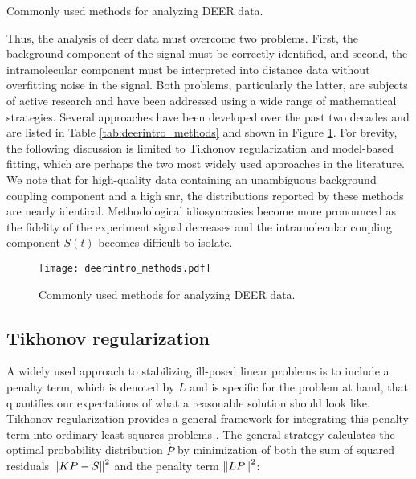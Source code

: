 \begin{wraptable}{r}{0.4\textwidth}
\scriptsize
\renewcommand{\tabcolsep}{0.09cm}
\centering
\caption[Commonly used methods for analyzing DEER data.]{Commonly used methods for analyzing DEER data.}

\label{tab:deerintro_methods}
\end{wraptable}

Thus, the analysis of \gls{deer} data must overcome two problems. First, the background component of the signal must be correctly identified, and second, the intramolecular component must be interpreted into distance data without overfitting noise in the signal. Both problems, particularly the latter, are subjects of active research and have been addressed using a wide range of mathematical strategies. Several approaches have been developed over the past two decades and are listed in Table \ref{tab:deerintro_methods} and shown in Figure \ref{fig:deerintro_methods}. For brevity, the following discussion is limited to Tikhonov regularization and model-based fitting, which are perhaps the two most widely used approaches in the literature. We note that for high-quality data containing an unambiguous background coupling component and a high \gls{snr}, the distributions reported by these methods are nearly identical. Methodological idiosyncrasies become more pronounced as the fidelity of the experiment signal decreases and the intramolecular coupling component $S(t)$ becomes difficult to isolate.

\begin{figure}[h]
\centering
\texttt{[image: deerintro\_methods.pdf]}
 \caption[Commonly used methods for analyzing DEER data.]{Commonly used methods for analyzing DEER data.}
\label{fig:deerintro_methods}
\end{figure}

\subsection{Tikhonov regularization}

A widely used approach to stabilizing ill-posed linear problems is to include a penalty term, which is denoted by $L$ and is specific for the problem at hand, that quantifies our expectations of what a reasonable solution should look like. Tikhonov regularization provides a general framework for integrating this penalty term into ordinary least-squares problems \citep*{Tikhonov1963}. The general strategy calculates the optimal probability distribution $\hat{P}$̂ by minimization of both the sum of squared residuals $\left\lVert KP-S\right\rVert^2$ and the penalty term $\left\lVert LP\right\rVert^2$:

